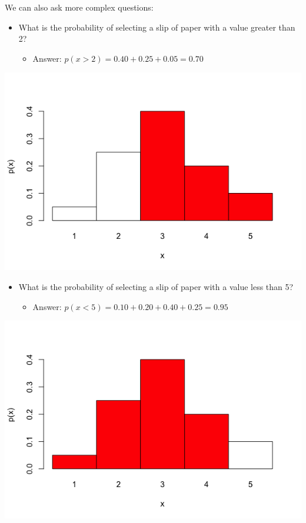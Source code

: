 \documentclass[11pt]{article}
\begin{document}
We can also ask more complex questions:

\begin{itemize}
\item What is the probability of selecting a slip of paper with a value greater than 2?
\begin{itemize}
\item Answer: $p(x>2) = 0.40 + 0.25 + 0.05 = 0.70$
\end{itemize}
\end{itemize}

\includegraphics[width=.9\linewidth]{figures/week5/plot2.png}

\begin{itemize}
\item What is the probability of selecting a slip of paper with a value less than 5?
\begin{itemize}
\item Answer: $p(x<5) = 0.10 + 0.20 + 0.40 + 0.25 = 0.95$
\end{itemize}
\end{itemize}

\includegraphics[width=.9\linewidth]{figures/week5/plot3.png}
\end{document}
